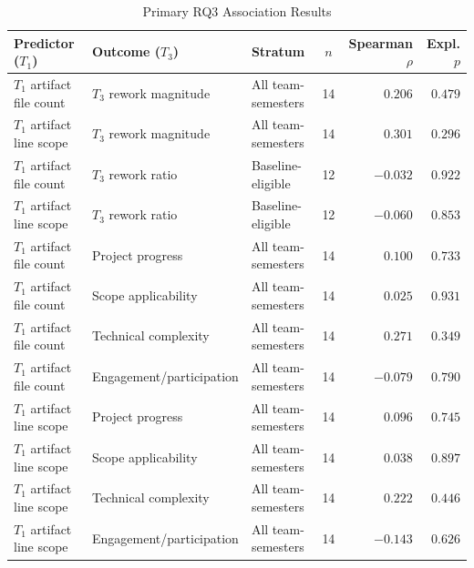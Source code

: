 \begin{table}[t]
\caption{Primary RQ3 Association Results}
\label{tab:rq3-associations}
\centering
\scriptsize
\setlength{\tabcolsep}{4pt}
\begin{tabular}{@{}lllcrr@{}}
\toprule
\textbf{Predictor ($T_1$)} & \textbf{Outcome ($T_3$)} & \textbf{Stratum} & \textbf{$n$} & \textbf{Spearman $\rho$} & \textbf{Expl. $p$} \\
\midrule
$T_1$ artifact file count & $T_3$ rework magnitude & All team-semesters & 14 & $0.206$ & $0.479$ \\
$T_1$ artifact line scope & $T_3$ rework magnitude & All team-semesters & 14 & $0.301$ & $0.296$ \\
$T_1$ artifact file count & $T_3$ rework ratio & Baseline-eligible & 12 & $-0.032$ & $0.922$ \\
$T_1$ artifact line scope & $T_3$ rework ratio & Baseline-eligible & 12 & $-0.060$ & $0.853$ \\
$T_1$ artifact file count & Project progress & All team-semesters & 14 & $0.100$ & $0.733$ \\
$T_1$ artifact file count & Scope applicability & All team-semesters & 14 & $0.025$ & $0.931$ \\
$T_1$ artifact file count & Technical complexity & All team-semesters & 14 & $0.271$ & $0.349$ \\
$T_1$ artifact file count & Engagement/participation & All team-semesters & 14 & $-0.079$ & $0.790$ \\
$T_1$ artifact line scope & Project progress & All team-semesters & 14 & $0.096$ & $0.745$ \\
$T_1$ artifact line scope & Scope applicability & All team-semesters & 14 & $0.038$ & $0.897$ \\
$T_1$ artifact line scope & Technical complexity & All team-semesters & 14 & $0.222$ & $0.446$ \\
$T_1$ artifact line scope & Engagement/participation & All team-semesters & 14 & $-0.143$ & $0.626$ \\
\bottomrule
\end{tabular}
\end{table}


